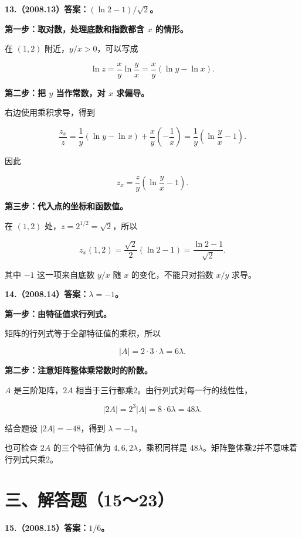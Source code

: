 \documentclass[UTF8,11pt,fontset=windows]{ctexart}
\begin{document}
\clearpage

\textbf{13.（2008.13）答案：$(\ln2-1)/\sqrt2$。}

\textbf{第一步：取对数，处理底数和指数都含 $x$ 的情形。}

在 $(1,2)$ 附近，$y/x>0$，可以写成

$$
\ln z=\frac xy\ln\frac yx
=\frac xy(\ln y-\ln x).
$$

\textbf{第二步：把 $y$ 当作常数，对 $x$ 求偏导。}

右边使用乘积求导，得到

$$
\frac{z_x}{z}
=\frac1y(\ln y-\ln x)+\frac xy\left(-\frac1x\right)
=\frac1y\left(\ln\frac yx-1\right).
$$

因此

$$
z_x=\frac zy\left(\ln\frac yx-1\right).
$$

\textbf{第三步：代入点的坐标和函数值。}

在 $(1,2)$ 处，$z=2^{1/2}=\sqrt2$，所以

$$
\boxed{z_x(1,2)=\frac{\sqrt2}{2}(\ln2-1)
=\frac{\ln2-1}{\sqrt2}}.
$$

其中 $-1$ 这一项来自底数 $y/x$ 随 $x$ 的变化，不能只对指数 $x/y$ 求导。

\clearpage

\textbf{14.（2008.14）答案：$\lambda=-1$。}

\textbf{第一步：由特征值求行列式。}

矩阵的行列式等于全部特征值的乘积，所以

$$
|A|=2\cdot3\cdot\lambda=6\lambda.
$$

\textbf{第二步：注意矩阵整体乘常数时的阶数。}

$A$ 是三阶矩阵，$2A$ 相当于三行都乘2。由行列式对每一行的线性性，

$$
|2A|=2^3|A|=8\cdot6\lambda=48\lambda.
$$

结合题设 $|2A|=-48$，得到 $\boxed{\lambda=-1}$。

也可检查 $2A$ 的三个特征值为 $4,6,2\lambda$，乘积同样是 $48\lambda$。矩阵整体乘2并不意味着行列式只乘2。

\clearpage

\section*{三、解答题（15～23）}

\textbf{15.（2008.15）答案：$1/6$。}
\end{document}
